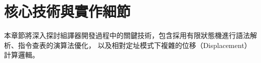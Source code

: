 \chapter{核心技術與實作細節}

本章節將深入探討組譯器開發過程中的關鍵技術，包含採用有限狀態機進行語法解析、指令查表的演算法優化，
以及相對定址模式下複雜的位移（Displacement）計算邏輯。





